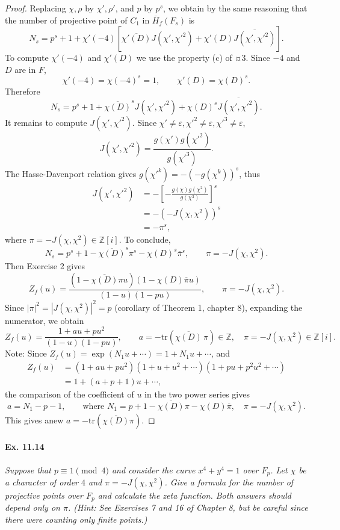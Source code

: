 \documentclass[11pt,a4paper]{article}
\newcommand{\Z}{\mathbb{Z}}
\begin{document}
\begin{proof}
Replacing $\chi, \rho$ by $\chi',\rho'$, and $p$ by $p^s$, we obtain by the same reasoning that the number of projective point of $C_1$ in $\overline{H}_f(F_s)$ is
$$N_s = p^s+1 + \chi'(-4)\left[\overline{\chi'(D)} J(\chi',\chi'^2) +\chi'(D) \overline{J(\chi',\chi'^2)}\right].$$
To compute $\chi'(-4)$ and $\chi'(D)$ we use the property (c) of ¤3. Since $-4$ and $D$ are in $F$,
$$\chi'(-4) = \chi(-4) ^s = 1,\qquad \chi'(D) = \chi(D)^s.$$
Therefore
$$N_s = p^s+1 + \overline{\chi(D)}^s J(\chi',\chi'^2) +\chi(D)^s \overline{J(\chi',\chi'^2)}.$$
It remains to compute $J(\chi',\chi'^2)$. Since $\chi' \ne \varepsilon, \chi'^2 \ne \varepsilon, \chi'^3 \ne \varepsilon$,
$$J(\chi',\chi'^2) = \frac{g(\chi') g(\chi'^2)}{g(\chi'^3)}.$$
The Hasse-Davenport relation gives $g(\chi'^k) = - (- g(\chi^k))^s$, thus
\begin{align*}
J(\chi',\chi'^2) &= - \left[- \frac{ g(\chi) g(\chi^2)}{g(\chi^3)}\right]^s\\
&= - (-J(\chi,\chi^2))^s\\
&= -\pi^s,
\end{align*}
where $\pi =-J(\chi,\chi^2) \in \Z[i]$. To conclude,
$$N_s = p^s + 1 - \overline{\chi(D)}^s \pi^s - \chi(D)^s \overline{\pi}^s,\qquad \pi = -J(\chi,\chi^2).$$
Then Exercise 2 gives
$$Z_f(u) = \frac{(1- \overline{\chi(D)} \pi u)(1 - \chi(D) \overline{\pi}u)}{(1-u)(1-pu)},\qquad \pi = -J(\chi,\chi^2).$$
Since $|\pi|^2 = |J(\chi,\chi^2)|^2 = p$ (corollary of Theorem 1, chapter 8), expanding the numerator, we obtain
$$Z_f(u) = \frac{1  + a u + pu^2}{(1-u)(1-pu)},\qquad a = -\mathrm{tr}\left(\overline{\chi(D)} \, \pi \right) \in \Z, \quad \pi = - J(\chi,\chi^2) \in \Z[i].$$
\bigskip
Note: Since $Z_f(u) =\exp(N_1u+ \cdots) = 1 + N_1 u + \cdots$, and
\begin{align*}
Z_f(u) &= (1 +au + pu^2)(1 + u + u^2+\cdots)(1+pu+p^2 u^2 + \cdots)\\
&= 1 + (a+p+1) u + \cdots,
\end{align*}
the comparison of the coefficient of $u$ in the two power series gives
$$a = N_1 - p - 1, \qquad \text{where } N_1 = p+1 - \overline{\chi(D)} \pi - \chi(D) \overline{\pi}, \quad \pi = - J(\chi,\chi^2).$$
This gives anew $a=  -\mathrm{tr}\left(\overline{\chi(D)}\pi\right)$.


\end{proof}

\paragraph{Ex. 11.14}{\it Suppose that $p\equiv 1 \pmod 4$ and consider the curve $x^4 + y^4 = 1$ over $F_p$. Let $\chi$ be a character of order $4$ and $\pi = -J(\chi,\chi^2)$. Give a formula for the number of projective points over $F_p$ and calculate the zeta function. Both answers should depend only on $\pi$. (Hint: See Exercises 7 and 16 of Chapter 8, but be careful since there were counting only finite points.)
}
\end{document}
